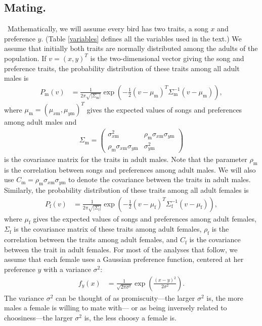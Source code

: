 \documentclass{article}
\newcommand{\x}[1]{\text{#1}}
\begin{document}
\subsection*{Mating. }
\ Mathematically, we will assume every bird has two traits, a song $x$ and preference $y$. (Table \ref{variables} defines all the variables used in the text.) We assume that initially both traits are normally distributed among the adults of the population. 
If $v=(x,y)^T$ is the two-dimensional vector giving the song and preference traits, the probability distribution of these traits among all adult males is 
\begin{align*}
P_\x{m}(v)&=\frac{1}{2\pi\sqrt{|\Sigma_\x{m}|}}\exp\left(-\frac{1}{2}(v-\mu_\x{m})^T\Sigma_\x{m}^{-1}(v-\mu_\x{m})\right),
\end{align*} where $\mu_\x{m}=(\mu_{x\x{m}},\mu_{y\x{m}})^T$ gives the expected values of songs and preferences among adult males and 
\begin{align*}
\Sigma_{\x{m}}=\left(\begin{array}{cc}\sigma_{x\x{m}}^2 & \rho_\x{m}\sigma_{x\x{m}}\sigma_{y\x{m}} \\ \rho_\x{m}\sigma_{x\x{m}}\sigma_{y\x{m}} & \sigma_{y\x{m}}^2 \end{array}\right)
\end{align*}
is the covariance matrix for the traits in adult males. Note that the parameter $\rho_\x{m}$ is the correlation between songs and preferences among adult males. We will also use $C_\x{m}=\rho_\x{m}\sigma_{x\x{m}}\sigma_{y\x{m}}$ to denote the covariance between the traits in adult males. Similarly, the probability distribution of these traits among all adult females is 
\begin{align*}
P_\x{f}(v)&=\frac{1}{2\pi\sqrt{|\Sigma_\x{f}|}}\exp\left(-\frac{1}{2}(v-\mu_\x{f})^T\Sigma_\x{f}^{-1}(v-\mu_\x{f})\right), 
\end{align*}
where $\mu_\x{f}$ gives the expected values of songs and preferences among adult females,  $\Sigma_\x{f}$ is the covariance matrix of these traits among adult females, $\rho_\x{f}$ is the correlation between the traits among adult females, and $C_\x{f}$ is the covariance between the trait in adult females. For most of the analyses that follow, we assume that each female uses a Gaussian preference function, centered at her preference $y$ with a variance $\sigma^2$:
\begin{align*}
f_y(x)&=\frac{1}{\sqrt{2\pi\sigma^2}}\exp\left(\frac{(x-y)^2}{2\sigma^2}\right).
\end{align*}
The variance $\sigma^2$ can be thought of as promiscuity---the larger $\sigma^2$ is, the more males a female is willing to mate with--- or as being inversely related to choosiness---the larger $\sigma^2$ is, the less choosy a female is. 
\end{document}
